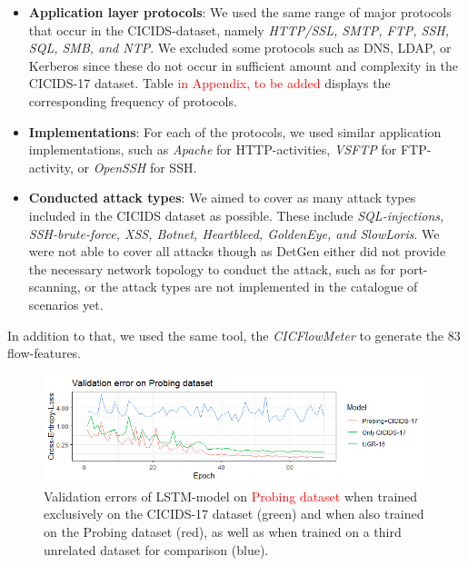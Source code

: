 \documentclass[runningheads]{llncs}
\begin{document}
\begin{itemize}

\item \textbf{Application layer protocols}: We used the same range of major protocols that occur in the CICIDS-dataset, namely \textit{HTTP/SSL, SMTP, FTP, SSH, SQL, SMB, and NTP}. We excluded some protocols such as DNS, LDAP, or Kerberos since these do not occur in sufficient amount and complexity in the CICIDS-17 dataset. Table \textcolor{red}{in Appendix, to be added} displays the corresponding frequency of protocols.



\item \textbf{Implementations}: For each of the protocols, we used similar application implementations, such as \textit{Apache} for HTTP-activities, \textit{VSFTP} for FTP-activity, or \textit{OpenSSH} for SSH.

\item \textbf{Conducted attack types}: We aimed to cover as many attack types included in the CICIDS dataset as possible. These include \textit{SQL-injections, SSH-brute-force, XSS, Botnet, Heartbleed, GoldenEye, and SlowLoris}. We were not able to cover all attacks though as DetGen either did not provide the necessary network topology to conduct the attack, such as for port-scanning, or the attack types are not implemented in the catalogue of scenarios yet.


\end{itemize}

In addition to that, we used the same tool, the \textit{CICFlowMeter} to generate the 83 flow-features.


\begin{figure}
\centering
\includegraphics[width=0.99\textwidth]{images/ValLoss.png}
\caption{Validation errors of LSTM-model \cite{henryLSTM} on \textcolor{red}{Probing dataset} when trained exclusively on the CICIDS-17 dataset (green) and when also trained on the Probing dataset (red), as well as when trained on a third unrelated dataset for comparison (blue).}\label{Fig:ValLoss}
\end{figure}
\end{document}
